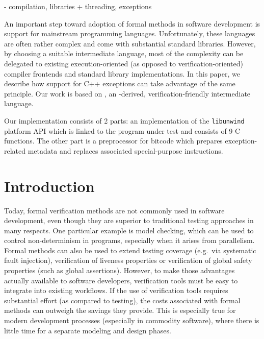 
- compilation, libraries + threading, exceptions


  An important step toward adoption of formal methods in software
  development is support for mainstream programming languages.
  Unfortunately, these languages are often rather complex and come with
  substantial standard libraries. However, by choosing a suitable
  intermediate language, most of the complexity can be delegated to
  existing execution-oriented (as opposed to verification-oriented)
  compiler frontends and standard library implementations. In this paper,
  we describe how support for C++ exceptions can take advantage of the
  same principle. Our work is based on \divm{}, an \llvm{}-derived,
  verification-friendly intermediate language.
  
  Our implementation consists of 2 parts: an implementation of the
  \texttt{libunwind} platform API which is linked to the program under
  test and consists of 9 C functions. The other part is a preprocessor for
  \llvm{} bitcode which prepares exception-related metadata and replaces
  associated special-purpose \llvm{} instructions.


\section{Introduction}\label{sec:introduction}

Today, formal verification methods are not commonly used in software
development, even though they are superior to traditional testing
approaches in many respects. One particular example is model checking,
which can be used to control non-determinism in programs, especially
when it arises from parallelism. Formal methods can also be used to
extend testing coverage (e.g.~via systematic fault injection),
verification of liveness properties or verification of global safety
properties (such as global assertions). However, to make those
advantages actually available to software developers, verification tools
must be easy to integrate into existing workflows. If the use of
verification tools requires substantial effort (as compared to testing),
the costs associated with formal methods can outweigh the savings they
provide. This is especially true for modern development processes
(especially in commodity software), where there is little time for a
separate modeling and design phases.

